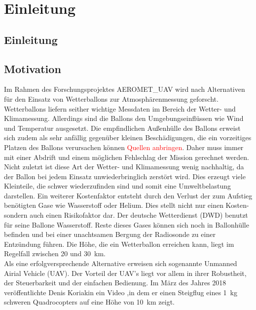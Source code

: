 \chapter{Einleitung}
\label{chap:Einleitung}

\section{Einleitung}
\label{sec:intro}

\section{Motivation}
\label{sec:motivation}
Im Rahmen des Forschungsprojektes AEROMET\_UAV wird nach Alternativen für den Einsatz von Wetterballons zur Atmosphärenmessung geforscht. Wetterballons liefern seither wichtige Messdaten im Bereich der Wetter- und Klimamessung. Allerdings sind die Ballons den Umgebungseinflüssen wie Wind und Temperatur ausgesetzt. Die empfindlichen Außenhülle des Ballons erweist sich zudem als sehr anfällig gegenüber kleinen Beschädigungen, die ein vorzeitiges Platzen des Ballons verursachen können \textcolor{red}{Quellen anbringen}. Daher muss immer mit einer Abdrift und einem möglichen Fehlschlag der Mission gerechnet werden. Nicht zuletzt ist diese Art der Wetter- und Klimamessung wenig nachhaltig, da der Ballon bei jedem Einsatz unwiederbringlich zerstört wird. Dies erzeugt viele Kleinteile, die schwer wiederzufinden sind und somit eine Umweltbelastung darstellen. Ein weiterer Kostenfaktor entsteht durch den Verlust der zum Aufstieg benötigten Gase wie Wasserstoff oder Helium. Dies stellt nicht nur einen Kosten- sondern auch einen Risikofaktor dar. Der deutsche Wetterdienst (DWD) benutzt für seine Ballone Wasserstoff. Reste dieses Gases können sich noch in Ballonhülle befinden und bei einer unachtsamen Bergung der Radiosonde zu einer Entzündung führen.
Die Höhe, die ein Wetterballon erreichen kann, liegt im Regelfall zwischen \SI{20}{} und \SI{30}{km}. 
\\ 
Als eine erfolgversprechende Alternative erweisen sich sogenannte Unmanned Airial Vehicle (UAV). Der Vorteil der UAV's liegt vor allem in ihrer Robustheit, der Steuerbarkeit und der einfachen Bedienung. Im März des Jahres 2018 veröffentlichte Denis Koriakin ein Video \cite{Anderson.2018},in dem er einen Steigflug eines \SI{1}{kg} schweren Quadrocopters auf eine Höhe von \SI{10}{km} zeigt. 


